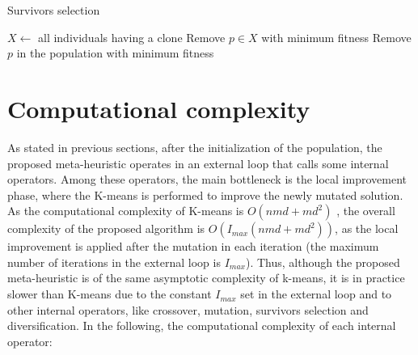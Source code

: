 \begin{algorithm}[H]
\caption{Survivors selection}
\label{survivors}
\begin{algorithmic}[1]
\STATE $X \leftarrow $ all individuals having a clone
\STATE Remove $p \in X$ with minimum fitness
\ELSE
\STATE Remove $p$ in the population with minimum fitness
\ENDIF
\ENDFOR
\end{algorithmic}
\end{algorithm}


\section{Computational complexity}
\label{sec:complexity-algo}
As stated in previous sections, after the initialization of the population, the proposed meta-heuristic operates in an external loop that calls some internal operators. Among these operators, the main bottleneck is the local improvement phase, where the K-means is performed to improve the newly mutated solution. As the computational complexity of K-means is $O(nmd + md^2)$ \cite{Hamerly2010}, the overall complexity of the proposed algorithm is $O(I_{max} (nmd + md^2))$, as the local improvement is applied after the mutation in each iteration (the maximum number of iterations in the external loop is $I_{max}$). Thus, although the proposed meta-heuristic is of the same asymptotic complexity of k-means, it is in practice slower than K-means due to the constant $I_{max}$ set in the external loop and to other internal operators, like crossover, mutation, survivors selection and diversification. In the following, the computational complexity of each internal operator:


